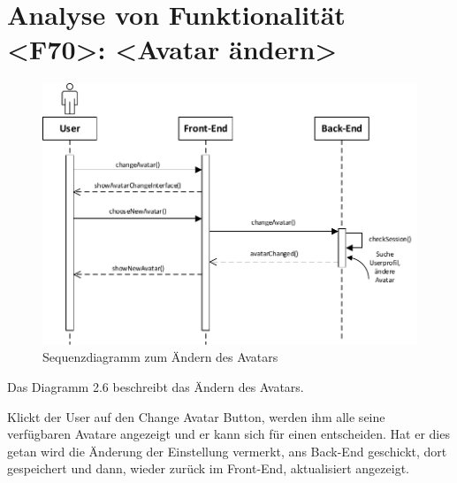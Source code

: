 \section{Analyse von Funktionalität <F70>: <Avatar ändern>} 
\begin{figure}[h]
\centering
\includegraphics[width=1.3\textwidth]{figures/sequenz_F70.pdf}
\caption{Sequenzdiagramm zum Ändern des Avatars}
\label{sequence}
\end{figure}
Das Diagramm 2.6 beschreibt das Ändern des Avatars.

Klickt der User auf den Change Avatar Button, werden ihm alle seine verfügbaren Avatare angezeigt und er kann sich für einen entscheiden. Hat er dies getan wird die Änderung der Einstellung vermerkt, ans Back-End geschickt, dort gespeichert und dann, wieder zurück im Front-End, aktualisiert angezeigt.

\newpage
